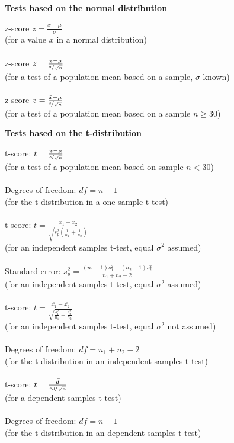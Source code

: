 \hfill\vline\hfill
\begin{minipage}[t]{.45\textwidth}
\begin{center}
    \textbf{Tests based on the normal distribution}
\end{center}
\hline
\answerskip
z-score \hfill $z = \frac{x - \mu}{\sigma}$\\
{\scriptsize (for a value $x$ in a normal distribution)} \\
\\
z-score \hfill $z = \frac{\bar{x} - \mu}{\nicefrac{\sigma}{\sqrt{n}}}$\\
{\scriptsize (for a test of a population mean based on a sample, $\sigma$ known)} \\
\\
z-score \hfill $z = \frac{\bar{x} - \mu}{\nicefrac{s}{\sqrt{n}}}$\\
{\scriptsize (for a test of a population mean based on a sample $n \geq 30$)} \\
\begin{center}
    \textbf{Tests based on the t-distribution}
\end{center}
\hline
\answerskip
t-score: \hfill $t = \frac{\bar{x} - \mu}{\nicefrac{s}{\sqrt{n}}}$\\
{\scriptsize (for a test of a population mean based on sample $n < 30$)} \\
\\
Degrees of freedom: \hfill $df = n - 1$\\
{\scriptsize (for the t-distribution in a one sample t-test)} \\
\\
t-score: \hfill $t = \frac{\bar{x_1} - \bar{x_2}}
{\sqrt{s^2_p (\frac{1}{n_1} + \frac{1}{n_2})}}$\\
{\scriptsize (for an independent samples t-test, equal $\sigma^2$ assumed)} \\
\\
Standard error: \hfill $s^2_p = \frac{(n_1 - 1) s^2_1 + (n_2 - 1) s^2_2}{n_1 + n_2 - 2}$\\
{\scriptsize (for an independent samples t-test, equal $\sigma^2$ assumed)} \\
\\
t-score: \hfill $t = \frac{\bar{x_1} - \bar{x_2}}
{\sqrt{\frac{s_1^2}{n_1} + \frac{s_2^2}{n_2}}}$\\
{\scriptsize (for an independent samples t-test, equal $\sigma^2$ not assumed)} \\
\\
Degrees of freedom: \hfill $df = n_1 + n_2 - 2$\\
{\scriptsize (for the t-distribution in an independent samples t-test)} \\
\\
t-score: \hfill $t = \frac{\bar{d}}
{\nicefrac{s_d}{\sqrt{n}}}$\\
{\scriptsize (for a dependent samples t-test)} \\
\\
Degrees of freedom: \hfill $df =n - 1$\\
{\scriptsize (for the t-distribution in an dependent samples t-test)} \\
\end{minipage}

